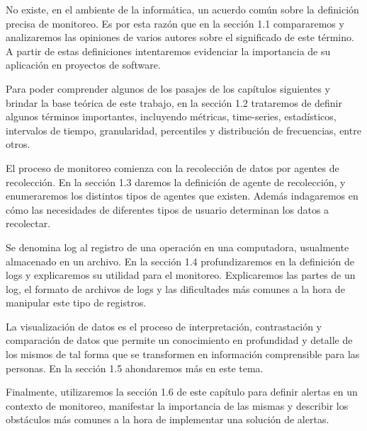 No existe, en el ambiente de la informática, un acuerdo común sobre la definición precisa de monitoreo. Es por esta razón que en la sección 1.1 compararemos y analizaremos las opiniones de varios autores sobre el significado de este término. A partir de estas definiciones intentaremos evidenciar la importancia de su aplicación en proyectos de software.

Para poder comprender algunos de los pasajes de los capítulos siguientes y brindar la base teórica de este trabajo, en la sección 1.2 trataremos de definir algunos términos importantes, incluyendo métricas,  time-series, estadísticos, intervalos de tiempo, granularidad, percentiles y distribución de frecuencias, entre otros. 

El proceso de monitoreo comienza con la recolección de datos por agentes de recolección. En la sección 1.3 daremos la definición de agente de recolección, y enumeraremos los distintos tipos de agentes que existen. Además indagaremos en cómo las necesidades de diferentes tipos de usuario determinan los datos a recolectar.

Se denomina log al registro de una operación en una computadora, usualmente almacenado en un archivo. En la sección 1.4 profundizaremos en la definición de logs y explicaremos su utilidad para el monitoreo. Explicaremos las partes de un log, el formato de archivos de logs y las dificultades más comunes a la hora de manipular este tipo de registros.

La visualización de datos es el proceso de interpretación, contrastación y comparación de datos que permite un conocimiento en profundidad y detalle de los mismos de tal forma que se transformen en información comprensible para las personas. En la sección 1.5 ahondaremos más en este tema.

Finalmente, utilizaremos la sección 1.6 de este capítulo para definir alertas en un contexto de monitoreo, manifestar la importancia de las mismas y describir los obstáculos más comunes a la hora de implementar una solución de alertas.
